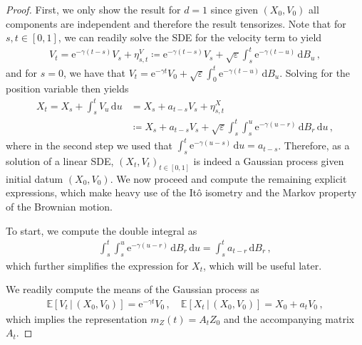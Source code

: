 \documentclass[12pt]{article}
\theoremstyle{plain}
\theoremstyle{plain}
\theoremstyle{remark}
\newcommand{\bbE}{\mathbb{E}}
\newcommand{\dd}{\,\mathrm{d}}
\newcommand{\rme}{\mathrm{e}}
\newcommand*{\defeq}{\coloneqq}
\newcommand{\eps}{\varepsilon}
\newcommand{\ccint}[1]{\left[#1\right]}
\newcommand{\1}{\bm{1}}
\theoremstyle{plain}
\theoremstyle{definition}
\theoremstyle{remark}
\begin{document}
\begin{proof}
First, we only show the result for $d=1$ since given $(X_0,V_0)$ all components are independent and therefore the result tensorizes. Note that for $s,t \in \ccint{0,1}$, we can readily solve the SDE for the velocity term to yield
\begin{align*}
    V_t = \rme^{-\gamma(t-s)}V_s + \eta_{s,t}^V \defeq \rme^{-\gamma(t-s)}V_s + \sqrt{\eps}\int_s^t \rme^{-\gamma(t-u)}\dd B_u\,,
\end{align*}
and for $s=0$, we have that $V_t = \rme^{-\gamma t}V_0 + \sqrt{\eps}\int_0^t \rme^{-\gamma(t-u)} \dd B_u$. Solving for the position variable then yields
\begin{align*}
    X_t = X_s + \int_s^t V_u \dd u  &= X_s + a_{t-s}V_s + \eta_{s,t}^X\\
    &\defeq X_s + a_{t-s}V_s+ \sqrt{\varepsilon} \int_s^t \int_{s}^{u} \rme^{-\gamma(u - r)} \dd B_{r} \dd u\,,
\end{align*}
where in the second step we used that $\int_s^t \rme^{-\gamma(u-s)}\dd u = a_{t-s}$. Therefore, as a solution of a linear SDE, $(X_t,V_t)_{t\in \ccint{0,1}}$ is indeed a Gaussian process given initial datum $(X_0,V_0)$. We now proceed and compute the remaining explicit expressions, which make heavy use of the It\^o isometry and the Markov property of the Brownian motion.

To start, we compute the double integral as
\begin{align*}
  \int_s^t \int_s^u \rme^{-\gamma(u-r)} \dd B_r \dd u = \int_s^t a_{t-r}\dd B_r\,,
\end{align*}
which further simplifies the expression for $X_t$, which will be useful later.

We readily compute the means of the Gaussian process as
\begin{align*}
    \bbE[V_t\,|\,(X_0,V_0)] = \rme^{-\gamma t} V_0\,, \quad \bbE[X_t\,|\,(X_0,V_0)] = X_0 + a_tV_0\,,
\end{align*}
which implies the representation $m_Z(t) = A_t Z_0$ and the accompanying matrix $A_t$.


\end{proof}
\end{document}
